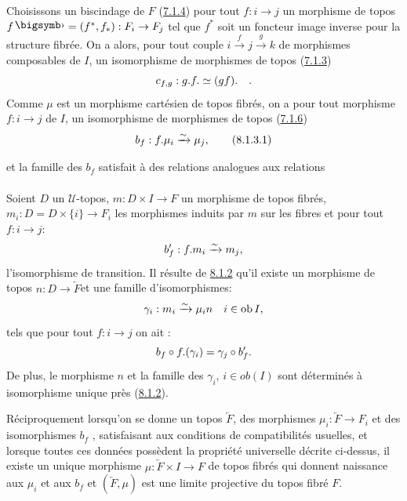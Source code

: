 \documentclass[10pt]{../fichiers-configuration-latex/smfart}
\begin{document}
Choisissons un biscindage de $F$ (\hyperref[VI.subsubsec7.1.4]{7.1.4}) \ie pour tout $f : i \to j$
un morphisme de topos $f\bigdot = (f^{\ast}, f_{\ast}) : F_i \to F_j$ tel
que $f^{\ast}$ soit un foncteur image inverse pour la structure
fibrée. On a alors, pour tout couple $i \xrightarrow{f} j
\xrightarrow{g} k$ de morphismes composables de $I$, un isomorphisme de
morphismes de topos (\hyperref[VI.subsubsec7.1.3]{7.1.3})
$$
c_{f, g} : g.f. \simeq (gf).\quad {}.
$$
Comme $\mu$ est un morphisme cartésien de topos fibrés, on a pour tout
morphisme $f : i \to j$ de $I$, un isomorphisme de morphismes de topos
(\hyperref[VI.subsubsec7.1.6]{7.1.6})
\begin{equation*}
b_f  : f. \mu_i \xrightarrow{\sim} \mu_j{},\tag{8.1.3.1}
\end{equation*}

et la famille des $b_f$ satisfait à des relations analogues aux
relations 

\setcounter{paragraph}{1}
\paragraph{}

Soient $D$ un $𝒰$-topos, $m : D \times I \to F$ un morphisme de topos
fibrés, $m_i : D = D \times \{i\} \to F_i$ les morphismes induits par
$m$ sur les fibres et pour tout $f : i \to j$:
$$
b'_f : f . m_i \xrightarrow{\sim} m_j{},
$$
l'isomorphisme de transition. Il résulte de \hyperref[VI.subsubsec8.1.2]{8.1.2} qu'il existe un
morphisme de topos $n : D \to
\underleftarrow{F}$\pageoriginale et une famille d'isomorphismes:
$$
\gamma_i : m_i \xrightarrow{\sim} \mu_i n \quad i \in \operatorname{ob} I {},
$$
tels que pour tout $f : i \to j$ on ait :
$$
b_f \circ f. (\gamma_i) = \gamma_j \circ b'_f{}.
$$
De plus, le morphisme $n$ et la famille des $\gamma_i$, $i \in ob (I)$
sont déterminés à isomorphisme unique près (\hyperref[VI.subsubsec8.1.2]{8.1.2}).

Réciproquement lorsqu'on se donne un topos $\underleftarrow{F}$, des
morphismes $\mu_i : \underleftarrow{F} \to F_i$ et des isomorphismes $b_f$
, satisfaisant aux conditions de compatibilités usuelles, et
lorsque toutes ces données possèdent la propriété universelle décrite
ci-dessus, il existe un unique morphisme $\mu : \underleftarrow{F} \times
I \to F$ de topos fibrés qui donnent naissance aux $\mu_{i}$ et aux
$b_f$ et $(\underleftarrow{F}, \mu)$ est une limite projective du topos
fibré $F$.
\end{document}
